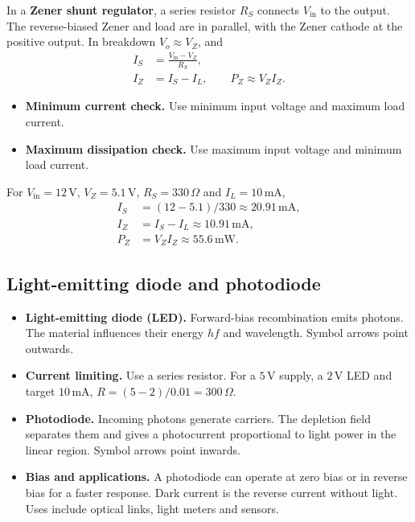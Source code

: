 \documentclass[12pt,a4paper]{article}
\begin{document}
In a \textbf{Zener shunt regulator}, a series resistor \(R_S\) connects \(V_{\mathrm{in}}\) to the output. The reverse-biased Zener and load are in parallel, with the Zener cathode at the positive output. In breakdown \(V_o\approx V_Z\), and
\[
\begin{aligned}
I_S&=\frac{V_{\mathrm{in}}-V_Z}{R_S},\\
I_Z&=I_S-I_L,\qquad P_Z\approx V_Z I_Z .
\end{aligned}
\]
\begin{itemize}[leftmargin=*, itemsep=3pt, topsep=4pt]
  \item \textbf{Minimum current check.} Use minimum input voltage and maximum load current.
  \item \textbf{Maximum dissipation check.} Use maximum input voltage and minimum load current.
\end{itemize}
\begin{tcolorbox}[examplebox,title={Shunt-regulator current and power}]
For \(V_{\mathrm{in}}=12\,\mathrm V\), \(V_Z=5.1\,\mathrm V\), \(R_S=330\,\Omega\) and \(I_L=10\,\mathrm{mA}\),
\[
\begin{aligned}
I_S &= (12-5.1)/330 \approx20.91\,\mathrm{mA},\\
I_Z &= I_S-I_L \approx10.91\,\mathrm{mA},\\
P_Z &= V_Z I_Z \approx55.6\,\mathrm{mW}.
\end{aligned}
\]
\end{tcolorbox}

\subsection{Light-emitting diode and photodiode}
\begin{itemize}[leftmargin=*, itemsep=3pt, topsep=4pt]
  \item \textbf{Light-emitting diode (LED).} Forward-bias recombination emits photons. The material influences their energy \(hf\) and wavelength. Symbol arrows point outwards.
  \item \textbf{Current limiting.} Use a series resistor. For a \(5\,\mathrm V\) supply, a \(2\,\mathrm V\) LED and target \(10\,\mathrm{mA}\), \(R=(5-2)/0.01=300\,\Omega\).
  \item \textbf{Photodiode.} Incoming photons generate carriers. The depletion field separates them and gives a photocurrent proportional to light power in the linear region. Symbol arrows point inwards.
  \item \textbf{Bias and applications.} A photodiode can operate at zero bias or in reverse bias for a faster response. Dark current is the reverse current without light. Uses include optical links, light meters and sensors.
\end{itemize}
\end{document}
